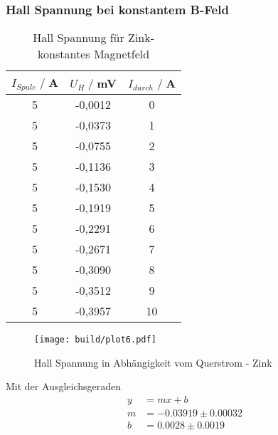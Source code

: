\subsubsection{Hall Spannung bei konstantem B-Feld}
\begin{table}
    \centering
    \begin{tabular}{c c c}
        \toprule
        $I_{Spule} \;/\;$A & $U_H\;/\;$mV & $I_{durch} \;/\;$A\\
        \midrule
            5                   &-0,0012&             0\\
            5                   &-0,0373&             1\\
            5                   &-0,0755&             2\\
            5                   &-0,1136&             3\\
            5                   &-0,1530&             4\\
            5                   &-0,1919&             5\\
            5                   &-0,2291&             6\\
            5                   &-0,2671&             7\\
            5                   &-0,3090&             8\\
            5                   &-0,3512&             9\\
            5                   &-0,3957&             10\\
        \bottomrule
    \end{tabular}
    \caption{Hall Spannung für Zink- konstantes Magnetfeld}
    \label{tab:Zn_B}
\end{table}
\begin{figure}[H]
    \centering
    \texttt{[image: build/plot6.pdf]}
    \caption{Hall Spannung in Abhängigkeit vom Querstrom - Zink}
    \label{fig:Zn_B}
\end{figure}
Mit der Ausgleichsgeraden
\begin{align*}
    y &= mx + b\\
    m &= -0.03919\pm 0.00032\\
    b &=   0.0028\pm 0.0019\\ 
\end{align*}


